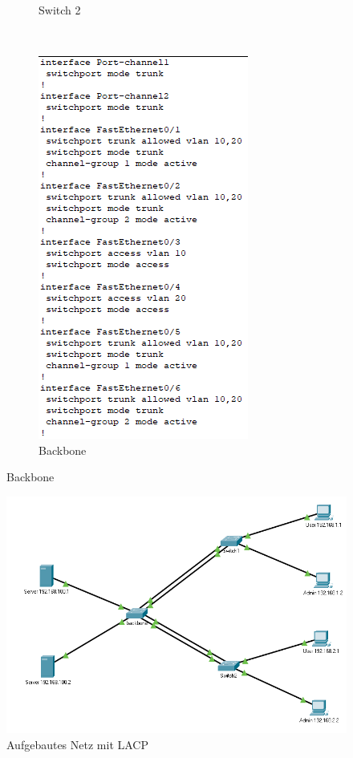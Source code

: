 \begin{figure}[!htb]
\begin{subfigure}{.45\textwidth}
        \caption{Switch 2}
    \end{subfigure}
    ~
    \begin{subfigure}{.45\textwidth}
        \includegraphics[width=\textwidth,height=\textwidth,keepaspectratio]{./img/lacp/BB.png}
        \caption{Backbone}
    \end{subfigure}
\end{figure}
\begin{figure}[!htb]
    \centering
    \includegraphics[width=\textwidth,height=\textwidth,keepaspectratio]{./img/lacp/config.png}
    \caption{Aufgebautes Netz mit LACP}
\end{figure}
\FloatBarrier

